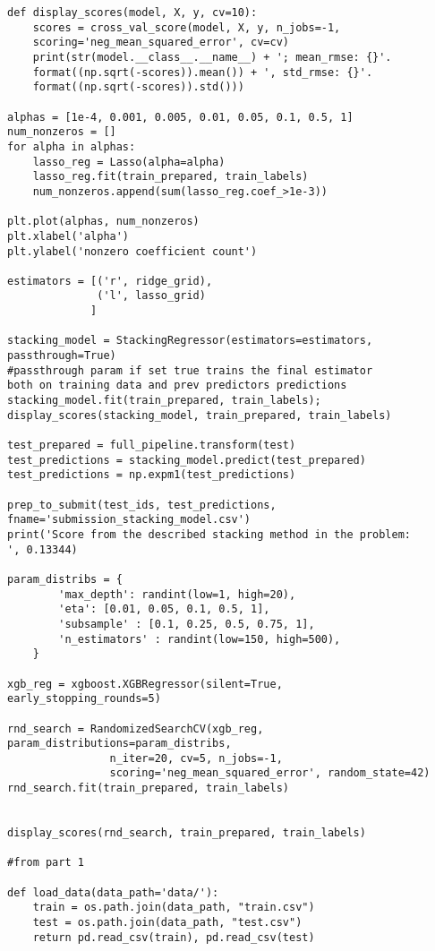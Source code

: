 \documentclass[12pt]{article}%
\begin{document}
\begin{lstlisting}
def display_scores(model, X, y, cv=10):
    scores = cross_val_score(model, X, y, n_jobs=-1,
    scoring='neg_mean_squared_error', cv=cv)
    print(str(model.__class__.__name__) + '; mean_rmse: {}'.
    format((np.sqrt(-scores)).mean()) + ', std_rmse: {}'.
    format((np.sqrt(-scores)).std()))
    
alphas = [1e-4, 0.001, 0.005, 0.01, 0.05, 0.1, 0.5, 1]
num_nonzeros = []
for alpha in alphas:
    lasso_reg = Lasso(alpha=alpha)
    lasso_reg.fit(train_prepared, train_labels)
    num_nonzeros.append(sum(lasso_reg.coef_>1e-3))
    
plt.plot(alphas, num_nonzeros)
plt.xlabel('alpha')
plt.ylabel('nonzero coefficient count')

estimators = [('r', ridge_grid),
              ('l', lasso_grid)
             ]

stacking_model = StackingRegressor(estimators=estimators,
passthrough=True)
#passthrough param if set true trains the final estimator 
both on training data and prev predictors predictions
stacking_model.fit(train_prepared, train_labels);
display_scores(stacking_model, train_prepared, train_labels)

test_prepared = full_pipeline.transform(test)
test_predictions = stacking_model.predict(test_prepared)
test_predictions = np.expm1(test_predictions)

prep_to_submit(test_ids, test_predictions,
fname='submission_stacking_model.csv')
print('Score from the described stacking method in the problem: 
', 0.13344)

param_distribs = {
        'max_depth': randint(low=1, high=20),
        'eta': [0.01, 0.05, 0.1, 0.5, 1],
        'subsample' : [0.1, 0.25, 0.5, 0.75, 1],
        'n_estimators' : randint(low=150, high=500),
    }

xgb_reg = xgboost.XGBRegressor(silent=True, 
early_stopping_rounds=5)

rnd_search = RandomizedSearchCV(xgb_reg, 
param_distributions=param_distribs,
                n_iter=20, cv=5, n_jobs=-1, 
                scoring='neg_mean_squared_error', random_state=42)
rnd_search.fit(train_prepared, train_labels)


display_scores(rnd_search, train_prepared, train_labels)

#from part 1

def load_data(data_path='data/'):
    train = os.path.join(data_path, "train.csv")
    test = os.path.join(data_path, "test.csv")
    return pd.read_csv(train), pd.read_csv(test)


\end{lstlisting}
\end{document}
